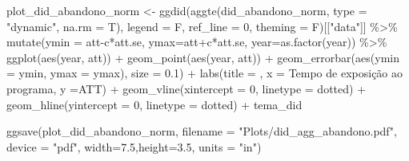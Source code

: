 \documentclass[
  letterpaper,
  DIV=11,
  numbers=noendperiod]{scrartcl}
\newenvironment{Shaded}{\begin{snugshade}}{\end{snugshade}}
\newcommand{\AttributeTok}[1]{\textcolor[rgb]{0.40,0.45,0.13}{#1}}
\newcommand{\DecValTok}[1]{\textcolor[rgb]{0.68,0.00,0.00}{#1}}
\newcommand{\FloatTok}[1]{\textcolor[rgb]{0.68,0.00,0.00}{#1}}
\newcommand{\FunctionTok}[1]{\textcolor[rgb]{0.28,0.35,0.67}{#1}}
\newcommand{\NormalTok}[1]{\textcolor[rgb]{0.00,0.23,0.31}{#1}}
\newcommand{\OtherTok}[1]{\textcolor[rgb]{0.00,0.23,0.31}{#1}}
\newcommand{\SpecialCharTok}[1]{\textcolor[rgb]{0.37,0.37,0.37}{#1}}
\newcommand{\StringTok}[1]{\textcolor[rgb]{0.13,0.47,0.30}{#1}}
\begin{document}
\begin{Shaded}
\begin{Highlighting}[]
\NormalTok{plot\_did\_abandono\_norm }\OtherTok{\textless{}{-}}
\FunctionTok{ggdid}\NormalTok{(}\FunctionTok{aggte}\NormalTok{(did\_abandono\_norm, }\AttributeTok{type =} \StringTok{"dynamic"}\NormalTok{, }\AttributeTok{na.rm =}\NormalTok{ T),       }
      \AttributeTok{legend =}\NormalTok{ F, }\AttributeTok{ref\_line =} \DecValTok{0}\NormalTok{, }\AttributeTok{theming =}\NormalTok{ F)[[}\StringTok{"data"}\NormalTok{]] }\SpecialCharTok{\%\textgreater{}\%} 
    \FunctionTok{mutate}\NormalTok{(}\AttributeTok{ymin =}\NormalTok{ att}\SpecialCharTok{{-}}\NormalTok{c}\SpecialCharTok{*}\NormalTok{att.se, }\AttributeTok{ymax=}\NormalTok{att}\SpecialCharTok{+}\NormalTok{c}\SpecialCharTok{*}\NormalTok{att.se, }\AttributeTok{year=}\FunctionTok{as.factor}\NormalTok{(year)) }\SpecialCharTok{\%\textgreater{}\%} 
    \FunctionTok{ggplot}\NormalTok{(}\FunctionTok{aes}\NormalTok{(year, att)) }\SpecialCharTok{+}
    \FunctionTok{geom\_point}\NormalTok{(}\FunctionTok{aes}\NormalTok{(year, att)) }\SpecialCharTok{+}
    \FunctionTok{geom\_errorbar}\NormalTok{(}\FunctionTok{aes}\NormalTok{(}\AttributeTok{ymin =}\NormalTok{ ymin, }\AttributeTok{ymax =}\NormalTok{ ymax), }\AttributeTok{size =} \FloatTok{0.1}\NormalTok{) }\SpecialCharTok{+}
    \FunctionTok{labs}\NormalTok{(}\AttributeTok{title =} \StringTok{\textquotesingle{}\textquotesingle{}}\NormalTok{,}
         \AttributeTok{x =} \StringTok{\textquotesingle{}Tempo de exposição ao programa\textquotesingle{}}\NormalTok{,}
         \AttributeTok{y =}\StringTok{\textquotesingle{}ATT\textquotesingle{}}\NormalTok{) }\SpecialCharTok{+}
    \FunctionTok{geom\_vline}\NormalTok{(}\AttributeTok{xintercept =} \StringTok{\textquotesingle{}0\textquotesingle{}}\NormalTok{, }\AttributeTok{linetype =} \StringTok{\textquotesingle{}dotted\textquotesingle{}}\NormalTok{) }\SpecialCharTok{+}
    \FunctionTok{geom\_hline}\NormalTok{(}\AttributeTok{yintercept =} \DecValTok{0}\NormalTok{, }\AttributeTok{linetype =} \StringTok{\textquotesingle{}dotted\textquotesingle{}}\NormalTok{) }\SpecialCharTok{+}
\NormalTok{    tema\_did}

\FunctionTok{ggsave}\NormalTok{(plot\_did\_abandono\_norm, }
       \AttributeTok{filename =} \StringTok{"Plots/did\_agg\_abandono.pdf"}\NormalTok{,}
       \AttributeTok{device =} \StringTok{"pdf"}\NormalTok{,}
       \AttributeTok{width=}\FloatTok{7.5}\NormalTok{,}\AttributeTok{height=}\FloatTok{3.5}\NormalTok{, }\AttributeTok{units =} \StringTok{"in"}\NormalTok{)}
\end{Highlighting}
\end{Shaded}
\end{document}
